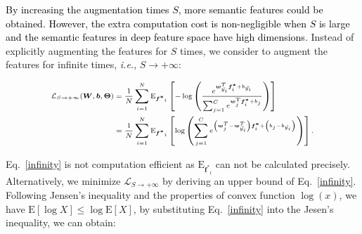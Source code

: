 \documentclass[10pt,journal,compsoc]{IEEEtran}
\newcommand{\ie}{\textit{i.e.}}
\newcommand{\revise}[1]{\textcolor{black}{#1}}
\begin{document}
\revise{By increasing the augmentation times $S$, more semantic features could be obtained.
%
However, the extra computation cost is non-negligible when $S$ is large and the semantic features in deep feature space have high dimensions}.
%
Instead of explicitly augmenting the features for $S$ times, we consider to augment the features for infinite times, \ie, $S\to+\infty$:
%

\revise{
\begin{equation}
\begin{scriptsize}
\begin{aligned}
    \label{infinity}
    \mathcal{L}_{S\to+\infty}(\boldsymbol{W}, \boldsymbol{b}, \boldsymbol{\Theta})&=\frac{1}{N} \sum_{i=1}^{N} \mathrm{E}_{\boldsymbol{{f^{*}}}_{i}}\left[-\log \left(\frac{e^{\boldsymbol{w}_{\tilde{y_{i}}}^{T} \boldsymbol{f^{*}}_{i}+b_{\tilde{y_{i}}}}}{\sum_{j=1}^{C} e^{\boldsymbol{w}_{j}^{\mathrm{T}} \boldsymbol{f^{*}}_{i}+b_{j}}}\right)\right] \\
    &=\frac{1}{N} \sum_{i=1}^{N} \mathrm{E}_{\boldsymbol{{f^{*}}}_{i}}\left[\log \left(\sum_{j=1}^{C} e^{\left(\boldsymbol{w}_{j}^{T}-\boldsymbol{w}_{\tilde{y_{i}}}^{T}\right) \boldsymbol{f^{*}}_{i}+\left(b_{j}-b_{\tilde{y_{i}}}\right)}\right)\right].
\end{aligned}
\end{scriptsize}
\end{equation}
}

Eq.~\ref{infinity} is not computation efficient as $\mathrm{E}_{\boldsymbol{{f^{*}}}_{i}}$ can not be calculated precisely.
%
Alternatively, we minimize $\mathcal{L}_{S\to+\infty} $ by deriving an upper bound of Eq.~\ref{infinity}.
%
Following Jensen's inequality and the properties of convex function $\log (x)$, we have $\mathrm{E}[\log X] \leq \log \mathrm{E}[X]$, by substituting Eq.~\ref{infinity} into the Jesen's inequality, we can obtain:
\end{document}

